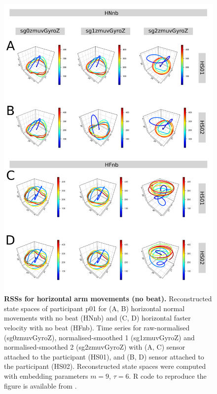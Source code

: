 \begin{figure}[!h]
\centering
\includegraphics[height=0.8\textheight]{rss_Hnb_w500}
\caption{
	{\bf RSSs for horizontal arm movements (no beat).}
	Reconstructed state spaces of participant p01 for 
	(A, B) horizontal normal movements with no beat (HNnb) and 
	(C, D) horizontal faster velocity with no beat (HFnb).
	Time series for raw-normalised (sg0zmuvGyroZ), 
	normalised-smoothed 1 (sg1zmuvGyroZ) and 
	normalised-smoothed 2 (sg2zmuvGyroZ) with
	(A, C) sensor attached to the participant (HS01), and
	(B, D) sensor attached to the participant (HS02).	
	Reconstructed state spaces were computed with 
	embedding parameters $m=9$, $\tau=6$.
	R code to reproduce the figure is available from \cite{hwum2018}.
        }
     \label{fig:rss_Hnb_w500}
\end{figure}



